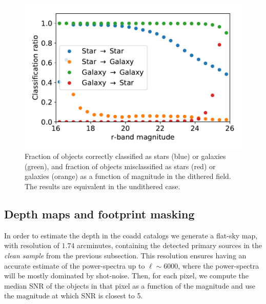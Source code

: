 \documentclass[twocolumn]{aastex62}
\begin{document}
\begin{figure}
\centering
\includegraphics[width=0.9\columnwidth]{stellar_contamination}
\caption{Fraction of objects correctly classified as stars (blue) or galaxies (green), and fraction of objects misclassified as stars (red) or galaxies (orange) as a function of magnitude in the dithered field. The results are equivalent in the undithered case.}
\label{fig:star_galaxy_separation}
\end{figure}
\subsection{Depth maps and footprint masking}
\label{sec:masking}

In order to estimate the depth in the coadd catalogs we generate a flat-sky map, with resolution of $1.74$ arcminutes, containing the detected primary sources in the \textit{clean sample} from the previous subsection. This resolution ensures having an accurate estimate of the power-spectra up to $\ell \sim 6000$, where the power-spectra will be mostly dominated by shot-noise. Then, for each pixel, we compute the median SNR of the objects in that pixel as a function of the magnitude and use the magnitude at which SNR is closest to 5.
\end{document}
